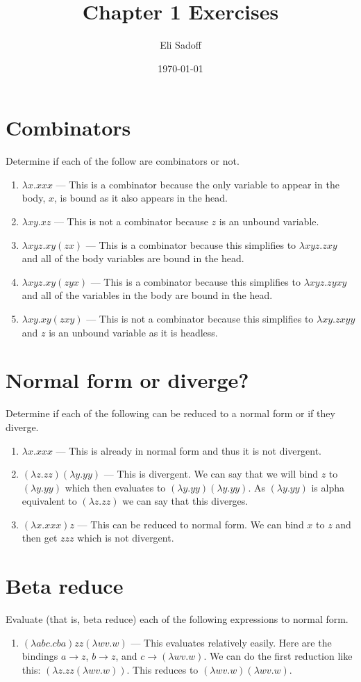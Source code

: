 \documentclass{article}
\author{Eli Sadoff}
\title{Chapter 1 Exercises}
\date{\today}
\begin{document}
\maketitle
\section{Combinators}
Determine if each of the follow are combinators or not.
\begin{enumerate}
  \item $\lambda x.xxx$ --- This is a combinator because the only variable to appear in the body,
$x$, is bound as it also appears in the head. 
  \item $\lambda xy.xz$ --- This is not a combinator because $z$ is an unbound variable.
  \item $\lambda xyz.xy(zx)$ --- This is a combinator because this simplifies to $\lambda xyz.zxy$
and all of the body variables are bound in the head.
  \item $\lambda xyz.xy(zyx)$ --- This is a combinator because this simplifies to $\lambda
xyz.zyxy$ and all of the variables in the body are bound in the head.
  \item $\lambda xy.xy(zxy)$ --- This is not a combinator because this simplifies to $\lambda
xy.zxyy$ and $z$ is an unbound variable as it is headless.
\end{enumerate}
\section{Normal form or diverge?}
Determine if each of the following can be reduced to a normal form or if they diverge.
\begin{enumerate}
  \item $\lambda x.xxx$ --- This is already in normal form and thus it is not divergent. 
  \item $(\lambda z.zz)(\lambda y.yy)$ --- This is divergent. We can say that we will bind $z$
    to $(\lambda y.yy)$ which then evaluates to $(\lambda y.yy)(\lambda y.yy)$. As $(\lambda
    y.yy)$ is alpha equivalent to $(\lambda z.zz)$ we can say that this diverges.
  \item $(\lambda x.xxx)z$ --- This can be reduced to normal form. We can bind $x$ to $z$ and
    then get $zzz$ which is not divergent. 
\end{enumerate}

\section{Beta reduce}
Evaluate (that is, beta reduce) each of the following expressions to normal form. 

\begin{enumerate}
  \item $(\lambda abc.cba)zz(\lambda wv.w)$ --- This evaluates relatively easily. Here are the
    bindings $a \to z$, $b \to z$, and $c \to (\lambda wv.w)$. We can do the first reduction like
    this:
    $(\lambda z.zz(\lambda wv.w))$. This reduces to $(\lambda wv.w)(\lambda wv.w)$.
\end{enumerate}
\end{document}
